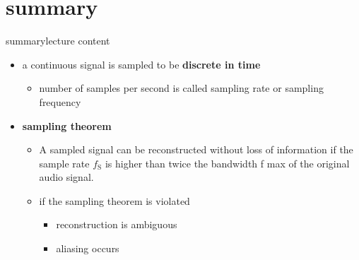     \section{summary}
        \begin{frame}{summary}{lecture content}
            \begin{itemize}
                \item   a continuous signal is sampled to be \textbf{discrete in time}
                    \begin{itemize}
                        \item   number of samples per second is called sampling rate or sampling frequency
                    \end{itemize}
                \bigskip
                \item      \textbf{sampling theorem}
                    \begin{itemize}
                        \item   A sampled signal can be reconstructed without loss of information if the sample rate $f_\mathrm{S}$ is higher than twice the bandwidth f max of the original audio signal.
                        \item   if the sampling theorem is violated
                            \begin{itemize}
                                \item   reconstruction is ambiguous
                                \item   aliasing occurs
                            \end{itemize}
                    \end{itemize}
            \end{itemize}
        \end{frame}

